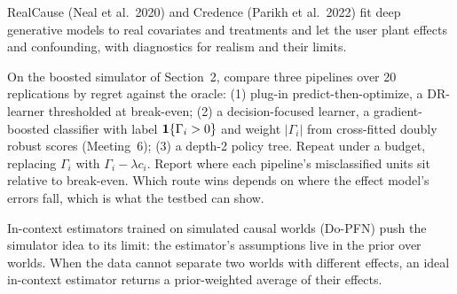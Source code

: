 \documentclass[11pt]{article}
\begin{document}
\begin{extension}
RealCause (Neal et al.\ 2020) and Credence (Parikh et al.\ 2022) fit deep generative models to real covariates and treatments and
let the user plant effects and confounding, with diagnostics for realism and their limits.
\end{extension}

\begin{extension}
On the boosted simulator of Section~2, compare three pipelines over 20 replications by regret against the oracle: (1)
plug-in predict-then-optimize, a DR-learner thresholded at break-even; (2) a decision-focused learner, a gradient-boosted classifier
with label $\mathbf{1}\{\Gamma_i > 0\}$ and weight $|\Gamma_i|$ from cross-fitted doubly robust scores (Meeting~6); (3) a depth-2 policy tree.
Repeat under a budget, replacing $\Gamma_i$ with $\Gamma_i - \lambda c_i$. Report where each pipeline's misclassified units sit relative
to break-even. Which route wins depends on where the effect model's errors fall, which is what the testbed can show.
\end{extension}

\begin{extension}
In-context estimators trained on simulated causal worlds (Do-PFN) push the simulator idea to its limit: the estimator's assumptions live in the
prior over worlds. When the data cannot separate two worlds with different effects, an ideal in-context estimator returns a
prior-weighted average of their effects.
\end{extension}
\end{document}
